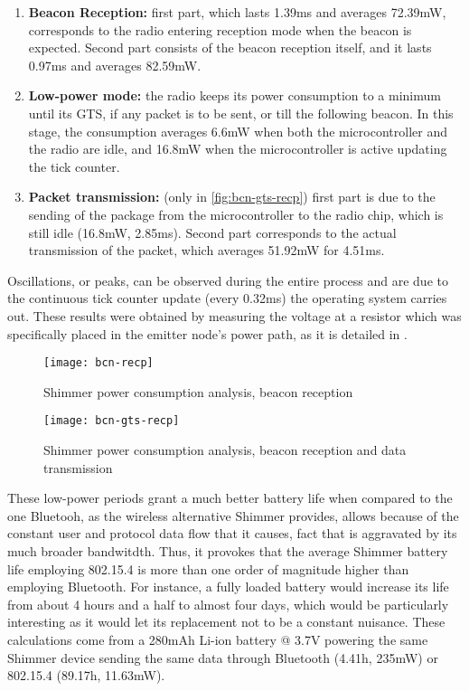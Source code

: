 			\begin{enumerate}
				\item \textbf{Beacon Reception:} first part, which lasts 1.39ms and averages 72.39mW, corresponds
					to the radio entering reception mode when the beacon is expected. Second part consists of
					the beacon reception itself, and it lasts 0.97ms and averages 82.59mW.
				\item \textbf{Low-power mode:} the radio keeps its power consumption to a minimum until its GTS,
					if any packet is to be sent, or till the following beacon. In this stage, the consumption
					averages 6.6mW when both the microcontroller and the radio are idle, and 16.8mW when the
					microcontroller is active updating the tick counter.
				\item \textbf{Packet transmission:} (only in \autoref{fig:bcn-gts-recp}) first part is due to the
					sending of the package from the microcontroller to the radio chip, which is still idle 
					(16.8mW, 2.85ms). Second part corresponds to the actual transmission of the packet, which
					averages 51.92mW for 4.51ms.
			\end{enumerate}

			Oscillations, or peaks, can be observed during the entire process and are due to the continuous
			tick counter update (every 0.32ms) the operating system carries out. These results were obtained 
			by measuring the voltage at a resistor which was specifically placed in the emitter node's power
			path, as it is detailed in \cite[p. 860]{ecg.del.paper}.

			\begin{figure}[h]
				\texttt{[image: bcn-recp]}
				\centering
				\caption{Shimmer power consumption analysis, beacon reception}
				\label{fig:bcn-recp}
			\end{figure}

			\begin{figure}[h]
				\texttt{[image: bcn-gts-recp]}
				\centering
				\caption{Shimmer power consumption analysis, beacon reception and data transmission}
				\label{fig:bcn-gts-recp}
			\end{figure}

			These low-power periods grant a much better battery life when compared to the one Bluetooh, as the
			wireless alternative Shimmer provides, allows because of the constant user and protocol data flow
			that it causes, fact that is aggravated by its much broader bandwitdth. Thus, it provokes that the
			average Shimmer battery life employing 802.15.4 is more than one order of magnitude higher than employing
			Bluetooth. For instance, a fully loaded battery would increase its life from about 4 hours and a half
			to almost four days, which would be particularly interesting as it would let its replacement not to be
			a constant nuisance. These calculations come from a 280mAh Li-ion battery @ 3.7V powering the same
			Shimmer device sending the same data through Bluetooth (4.41h, 235mW) or 802.15.4 (89.17h, 11.63mW).\\

